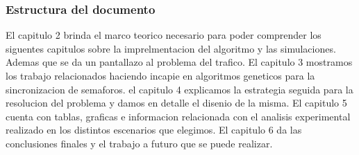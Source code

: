 \subsubsection{Estructura del documento}
El capitulo 2 brinda el marco teorico necesario para poder comprender los siguentes capitulos sobre la imprelmentacion del algoritmo y las simulaciones. Ademas que se da un pantallazo al problema del trafico.
El capitulo 3 mostramos los trabajo relacionados haciendo incapie en algoritmos geneticos para la sincronizacion de semaforos.
el capitulo 4 explicamos la estrategia seguida para la resolucion del problema y damos en detalle el disenio de la misma.
El capitulo 5 cuenta con tablas, graficas e informacion relacionada con el analisis experimental realizado en los distintos escenarios que elegimos.
El capitulo 6 da las conclusiones finales y el trabajo a futuro que se puede realizar.






